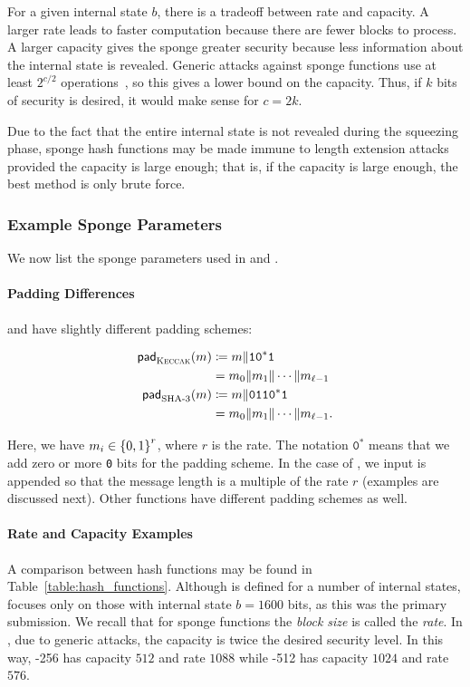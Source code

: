 For a given internal state $b$, there is a tradeoff
between rate and capacity.
A larger rate leads to faster computation
because there are fewer blocks to process.
A larger capacity gives the sponge greater security
because less information about the internal state is revealed.
Generic attacks against sponge functions use at least
$2^{c/2}$ operations~\cite[Chapter 5]{KeccakSponge2011},
so this gives a lower bound on the capacity.
Thus, if $k$ bits of security is desired,
it would make sense for $c = 2k$.

Due to the fact that the entire internal state is not revealed
during the squeezing phase,
sponge \glspl{hash function} may be made immune to length extension attacks
provided the capacity is large enough;
that is, if the capacity is large enough, the best method is only
brute force.

\subsubsection{Example Sponge Parameters}

We now list the sponge parameters used in
\Keccak{} and \ShaThree{}.

\paragraph{Padding Differences}
\Keccak{} and \ShaThree{} have slightly different padding schemes:

\begin{align}
    \textsf{pad}_{\text{\Keccak{}}}(m) &\mathDef{}
            m\|\texttt{10}^{*}\texttt{1} \nonumber\\
        &= m_{0}\|m_{1}\|\cdots\|m_{\ell-1} \nonumber\\
    \textsf{pad}_{\text{\ShaThree{}}}(m) &\mathDef{}
            m\|\texttt{0110}^{*}\texttt{1} \nonumber\\
        &= m_{0}\|m_{1}\|\cdots\|m_{\ell-1}.
\end{align}

\noindent
Here, we have $m_{i}\in\left\{ 0,1 \right\}^{r}$, where $r$ is the rate.
The notation $\texttt{0}^{*}$ means that we add zero or more \texttt{0} bits
for the padding scheme.
In the case of \Keccak{}, we input is appended so that the message
length is a multiple of the rate $r$ (examples are discussed next).
Other \ShaThree{} functions have different padding schemes as well.

\paragraph{Rate and Capacity Examples}
A comparison between \glspl{hash function} may be found in
Table~\ref{table:hash_functions}.
Although \Keccak{} is defined for a number of internal states,
\ShaThree{} focuses only on those with internal state $b=1600$ bits,
as this was the primary submission.
We recall that for sponge functions the \emph{block size}
is called the \emph{rate}.
In \ShaThree{}, due to generic attacks, the capacity is twice
the desired security level.
In this way, \ShaThree{}-256 has capacity $512$ and rate $1088$
while \ShaThree{}-512 has capacity $1024$ and rate $576$.
